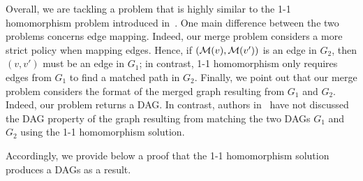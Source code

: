 Overall, we are tackling a problem that is highly similar to the 1-1 homomorphism problem introduced in~\cite{Fan:2010:GHR}. One main difference between the two problems concerns edge mapping. Indeed, our merge problem considers a more strict policy when mapping edges. Hence, if $({\mathcal M}(v),{\mathcal M}(v'))$ is an edge in $G_2$, then $(v,v')$ must be an edge in $G_1$; in contrast, 1-1 homomorphism only requires edges from $G_1$ to find a matched path in $G_2$. Finally, we point out that our merge problem considers the format of the merged graph resulting from $G_1$ and $G_2$. Indeed, our problem returns a DAG. In contrast, authors in~\cite{Fan:2010:GHR} have not discussed the DAG property of the graph resulting from matching the two DAGs $G_1$ and $G_2$ using the 1-1 homomorphism solution.

Accordingly, we provide below a proof that  the 1-1 homomorphism solution produces a DAGs as a result.


